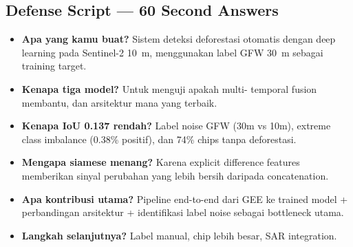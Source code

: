 \documentclass[10pt,a4paper,onecolumn]{article}
\begin{document}
\subsection*{Defense Script — 60 Second Answers}

\begin{itemize}[nosep]
    \item{\textbf{Apa yang kamu buat?} Sistem deteksi deforestasi
          otomatis dengan deep learning pada Sentinel-2 10~m,
          menggunakan label GFW 30~m sebagai training target.}
    \item{\textbf{Kenapa tiga model?} Untuk menguji apakah multi-
          temporal fusion membantu, dan arsitektur mana yang terbaik.}
    \item{\textbf{Kenapa IoU 0.137 rendah?} Label noise GFW (30m
          vs 10m), extreme class imbalance (0.38\% positif), dan
          74\% chips tanpa deforestasi.}
    \item{\textbf{Mengapa siamese menang?} Karena explicit difference
          features memberikan sinyal perubahan yang lebih bersih
          daripada concatenation.}
    \item{\textbf{Apa kontribusi utama?} Pipeline end-to-end dari
          GEE ke trained model + perbandingan arsitektur + identifikasi
          label noise sebagai bottleneck utama.}
    \item{\textbf{Langkah selanjutnya?} Label manual, chip lebih
          besar, SAR integration.}
\end{itemize}



\end{document}

